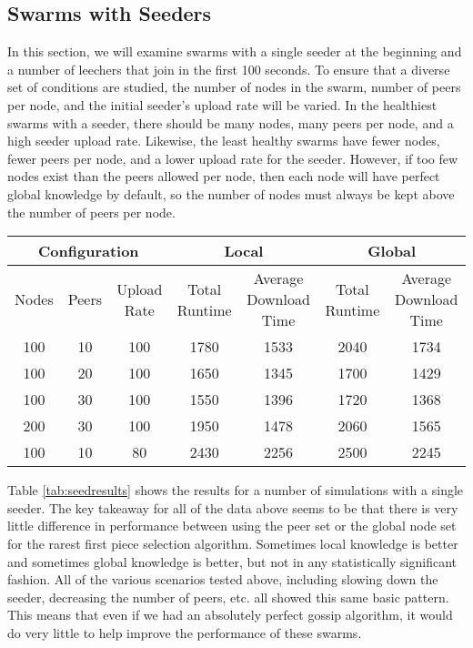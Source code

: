 \subsection{Swarms with Seeders}

In this section, we will examine swarms with a single seeder at the beginning
and a number of leechers that join in the first 100 seconds. To ensure
that a diverse set of conditions are studied, the number of nodes in the swarm, 
number of peers per node, and the initial seeder's upload rate will be varied.
In the healthiest swarms with a seeder, there should be many nodes, many peers per node, and
a high seeder upload rate. Likewise, the least healthy swarms have fewer nodes,
fewer peers per node, and a lower upload rate for the seeder. However, if too few
nodes exist than the peers allowed per node, then each node will have perfect global
knowledge by default, so the number of nodes must always be kept above
the number of peers per node. 


\begin{table*}
\centering
\caption{Swarms with Seeds Results}
\begin{tabular}{|c|c|c|c|c|c|c|} \hline
\multicolumn{3}{|c|}{Configuration} & \multicolumn{2}{|c|}{Local} & \multicolumn{2}{|c|}{Global} \\ \hline
Nodes & Peers & Upload Rate & Total Runtime & Average Download Time & Total Runtime & Average Download Time\\ \hline

100 & 10 & 100 & 1780 & 1533 & 2040 & 1734\\
100 & 20 & 100 & 1650 & 1345 & 1700 & 1429\\
100 & 30 & 100 & 1550 & 1396 & 1720 & 1368\\
200 & 30 & 100 & 1950 & 1478 & 2060 & 1565\\
100 & 10 & 80  & 2430 & 2256 & 2500 & 2245\\
\hline\end{tabular}
\label{tab:seedresults}
\end{table*}


Table \ref{tab:seedresults} shows the results for a number of simulations with a single
seeder. The key takeaway for all of the data above seems to be that there
is very little difference in performance between using the peer set or the
global node set for the rarest first piece selection algorithm. Sometimes
local knowledge is better and sometimes global knowledge is better,
but not in any statistically significant fashion. All of the various
scenarios tested above, including slowing down the seeder, decreasing
the number of peers, etc. all showed this same basic pattern. This means
that even if we had an absolutely perfect gossip algorithm, it would do
very little to help improve the performance of these swarms.

